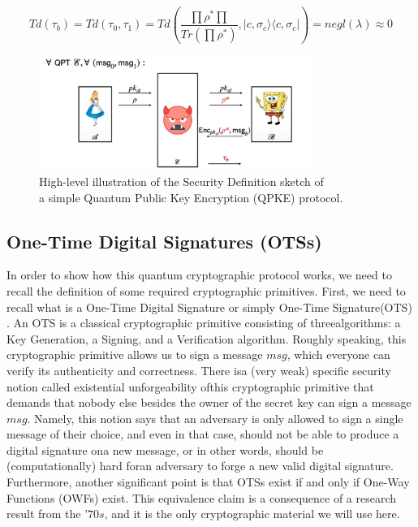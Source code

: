 \documentclass[12pt]{article}
\begin{document}
    $$ Td({\tau}_{b}) = Td({\tau}_{0}, {\tau}_{1}) = Td \left( \frac{ \prod {\rho}^{*} \prod }{ Tr( \prod {\rho}^{*} ) }, |c,{\sigma}_{c}\rangle\langle c, {\sigma}_{c}| \right) = negl(\lambda) \approx 0 $$
    
    \begin{figure}[ht]
        \captionsetup{justification=centering}
        \centering
        \includegraphics[width=0.8\textwidth]{figures/images/img-3.pdf}
        \caption{High-level illustration of the Security Definition sketch of\\ a simple Quantum Public Key Encryption (QPKE) protocol.}
    \end{figure}

    
    \subsection{One-Time Digital Signatures (OTSs)}
    \label{subsec:one-time-digital-signatures}

    In order to show how this quantum cryptographic protocol works, we need to recall the definition of some required cryptographic primitives. First, we need to recall what is a One-Time Digital Signature or simply One-Time Signature\break (OTS) \cite{lamport:constructing-digital-signatures-from-one-way-function:1979:03-2024}. An OTS is a classical cryptographic primitive consisting of three\break algorithms: a Key Generation, a Signing, and a Verification algorithm. Roughly speaking, this cryptographic primitive allows us to sign a message $msg$, which everyone can verify its authenticity and correctness. There is\break a (very weak) specific security notion called existential unforgeability of\break this cryptographic primitive that demands that nobody else besides the owner of the secret key can sign a message $msg$. Namely, this notion says that an adversary is only allowed to sign a single message of their choice, and even in that case, should not be able to produce a digital signature on\break a new message, or in other words, should be (computationally) hard for\break an adversary to forge a new valid digital signature. Furthermore, another significant point is that OTSs exist if and only if One-Way Functions (OWFs) \cite{diffie-hellman:new-directions-cryptography:1976:03-2024,lamport:constructing-digital-signatures-from-one-way-function:1979:03-2024,goldreich:modern-cryptography-probabilisitic-proofs-pseudorandomness:2013:03-2024} exist. This equivalence claim is a consequence of a research result from the '$70s$, and it is the only cryptographic material we will use here.
    
\end{document}
